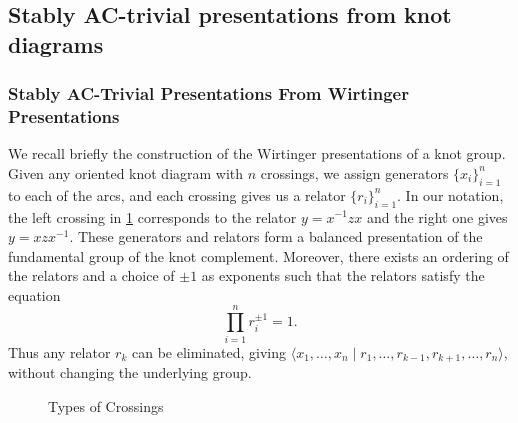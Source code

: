 
\subsection{Stably AC-trivial presentations from knot diagrams} \label{subsec:ac-unknot}



\subsubsection{Stably AC-Trivial Presentations From Wirtinger Presentations}

We recall briefly the construction of the Wirtinger presentations of a knot group. Given any oriented knot diagram with $n$ crossings, we assign generators $\{x_i\}_{i=1}^n$ to each of the arcs, and each crossing gives us a relator $\{r_i\}_{i=1}^n$. In our notation, the left crossing in \cref{fig:wp} corresponds to the relator $y=x^{-1}zx$ and the right one gives $y=xzx^{-1}$. These generators and relators form a balanced presentation of the fundamental group of the knot complement. Moreover, there exists an ordering of the relators and a choice of $\pm 1$ as exponents such that the relators satisfy the equation
$$\prod_{i=1}^nr_i^{\pm1}=1.$$
Thus any relator $r_k$ can be eliminated, giving $\langle x_1,\ldots,x_n\mid r_1,\ldots,r_{k-1},r_{k+1},\ldots,r_n\rangle$, without changing the underlying group. 

\begin{figure}
    \centering
{}
    \caption{Types of Crossings}
    \label{fig:wp}
\end{figure}

